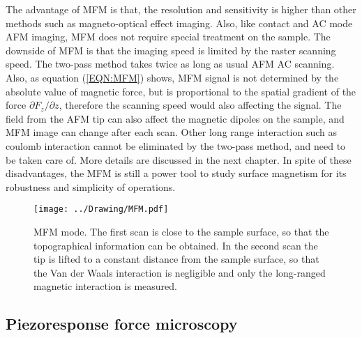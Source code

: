 \documentclass[pdftex, sectionletters]{pittetd}    %
\begin{document}
The advantage of MFM is that, the resolution and sensitivity is higher than other methods such as magneto-optical effect imaging. Also, like contact and AC mode AFM imaging, MFM does not require special treatment on the sample. The downside of MFM is that the imaging speed is limited by the raster scanning speed. The two-pass method takes twice as long as usual AFM AC scanning. Also, as equation (\ref{EQN:MFM}) shows, MFM signal is not determined by the absolute value of magnetic force, but is proportional to the spatial gradient of the force $\partial F_z/\partial z$, therefore the scanning speed would also affecting the signal. The field from the AFM tip can also affect the magnetic dipoles on the sample, and MFM image can change after each scan. Other long range interaction such as coulomb interaction cannot be eliminated by the two-pass method, and need to be taken care of. More details are discussed in the next chapter. In spite of these disadvantages, the MFM is still a power tool to study surface magnetism for its robustness and simplicity of operations.

\begin{figure}[h!]
	\centering
	\texttt{[image: ../Drawing/MFM.pdf]}
	\caption{MFM mode. The first scan is close to the sample surface, so that the topographical information can be obtained. In the second scan the tip is lifted to a constant distance from the sample surface, so that the Van der Waals interaction is negligible and only the long-ranged magnetic interaction is measured.}
	\label{FIG:MFM}
\end{figure}

\subsection{Piezoresponse force microscopy}
\end{document}
